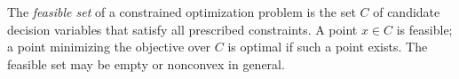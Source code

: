 
The \emph{feasible set} of a constrained optimization problem is the set $C$ of candidate decision variables that satisfy all prescribed constraints. A point $x\in C$ is feasible; a point minimizing the objective over $C$ is optimal if such a point exists. The feasible set may be empty or nonconvex in general.
